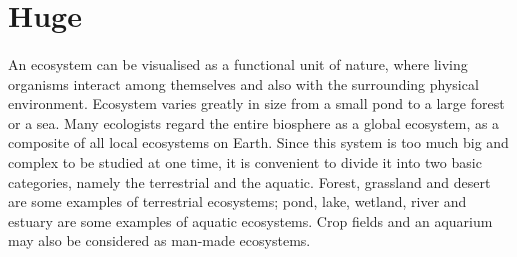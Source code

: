 \documentclass[12pt]{article}
\begin{document}
	\section{Huge}
	\paragraph{}
	
	{\Huge An ecosystem can be visualised as a functional unit of nature, where living 
		organisms interact among themselves and also with the surrounding physical 
		environment. Ecosystem varies greatly in size from a small pond to a large forest or a 
		sea. Many ecologists regard the entire biosphere as a global ecosystem, as a composite 
		of all local ecosystems on Earth. Since this system is too much big and complex to be 
		studied at one time, it is convenient to divide it into two basic categories, namely the 
		terrestrial and the aquatic. Forest, grassland and desert are some examples of terrestrial 
		ecosystems; pond, lake, wetland, river and estuary are some examples of aquatic 
		ecosystems. Crop fields and an aquarium may also be considered as man-made 
		ecosystems. }
		
\end{document}
